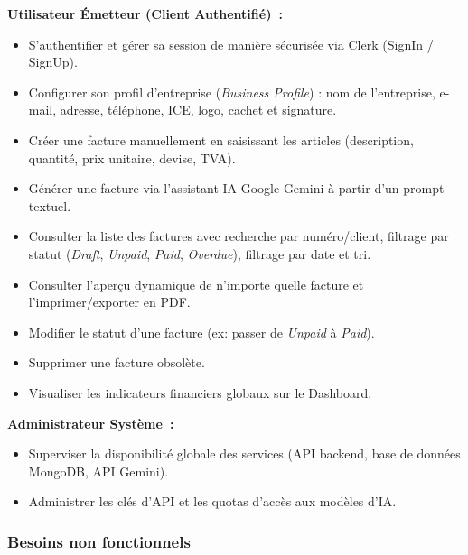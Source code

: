 \documentclass[a4paper,12pt]{extarticle}
\begin{document}
\vspace{0.5cm}
\textbf{Utilisateur Émetteur (Client Authentifié)~:}
\begin{itemize}
  \item S'authentifier et gérer sa session de manière sécurisée via Clerk (SignIn / SignUp).
  \item Configurer son profil d'entreprise (\textit{Business Profile}) : nom de l'entreprise, e-mail, adresse, téléphone, ICE, logo, cachet et signature.
  \item Créer une facture manuellement en saisissant les articles (description, quantité, prix unitaire, devise, TVA).
  \item Générer une facture via l'assistant IA Google Gemini à partir d'un prompt textuel.
  \item Consulter la liste des factures avec recherche par numéro/client, filtrage par statut (\textit{Draft}, \textit{Unpaid}, \textit{Paid}, \textit{Overdue}), filtrage par date et tri.
  \item Consulter l'aperçu dynamique de n'importe quelle facture et l'imprimer/exporter en PDF.
  \item Modifier le statut d'une facture (ex: passer de \textit{Unpaid} à \textit{Paid}).
  \item Supprimer une facture obsolète.
  \item Visualiser les indicateurs financiers globaux sur le Dashboard.
\end{itemize}

\vspace{0.5cm}
\textbf{Administrateur Système~:}
\begin{itemize}
  \item Superviser la disponibilité globale des services (API backend, base de données MongoDB, API Gemini).
  \item Administrer les clés d'API et les quotas d'accès aux modèles d'IA.
\end{itemize}

\subsubsection{Besoins non fonctionnels}
\end{document}
